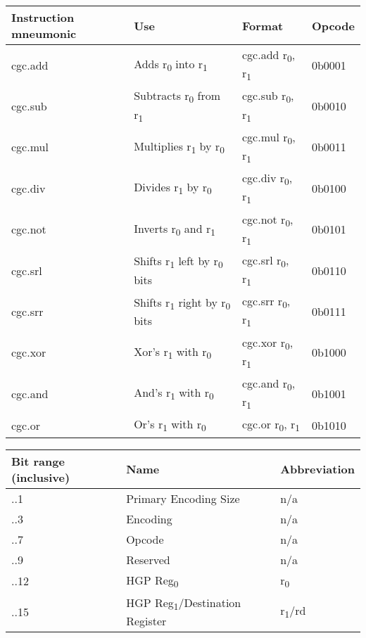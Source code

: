 \documentclass[6pt]{article}
\begin{document}
\begin{center}
\begin{tabularx}{\textwidth}{ |>{\raggedright\arraybackslash}X|>{\raggedright\arraybackslash}X|>{\raggedright\arraybackslash}X|>{\raggedright\arraybackslash}X| }
    \hline
    Instruction mneumonic & Use & Format & Opcode \\
    \hline
    cgc.add & Adds r\textsubscript{0} into r\textsubscript{1} & cgc.add r\textsubscript{0}, r\textsubscript{1} & 0b0001 \\
    \hline
    cgc.sub & Subtracts r\textsubscript{0} from r\textsubscript{1} & cgc.sub r\textsubscript{0}, r\textsubscript{1} & 0b0010 \\
    \hline
    cgc.mul & Multiplies r\textsubscript{1} by r\textsubscript{0} & cgc.mul r\textsubscript{0}, r\textsubscript{1} & 0b0011 \\
    \hline
    cgc.div & Divides r\textsubscript{1} by r\textsubscript{0} & cgc.div r\textsubscript{0}, r\textsubscript{1} & 0b0100 \\
    \hline
    cgc.not & Inverts r\textsubscript{0} and r\textsubscript{1} & cgc.not r\textsubscript{0}, r\textsubscript{1} & 0b0101 \\
    \hline
    cgc.srl & Shifts r\textsubscript{1} left by r\textsubscript{0} bits & cgc.srl r\textsubscript{0}, r\textsubscript{1} & 0b0110 \\
    \hline
    cgc.srr & Shifts r\textsubscript{1} right by r\textsubscript{0} bits & cgc.srr r\textsubscript{0}, r\textsubscript{1} & 0b0111 \\
    \hline
    cgc.xor & Xor's r\textsubscript{1} with r\textsubscript{0} & cgc.xor r\textsubscript{0}, r\textsubscript{1} & 0b1000 \\
    \hline
    cgc.and & And's r\textsubscript{1} with r\textsubscript{0} & cgc.and r\textsubscript{0}, r\textsubscript{1} & 0b1001 \\
    \hline
    cgc.or & Or's r\textsubscript{1} with r\textsubscript{0} & cgc.or r\textsubscript{0}, r\textsubscript{1} & 0b1010 \\
    \hline
\end{tabularx}
\end{center}

\begin{center}
\begin{tabularx}{\textwidth}{ |>{\raggedright\arraybackslash}X|>{\raggedright\arraybackslash}X|>{\raggedright\arraybackslash}X| }
    \hline
    Bit range (inclusive) & Name & Abbreviation \\
    \hline
    0..1 & Primary Encoding Size & n/a \\
    \hline
    2..3 & Encoding & n/a \\
    \hline
    4..7 & Opcode & n/a \\
    \hline
    8..9 & Reserved & n/a \\
    \hline
    10..12 & HGP Reg\textsubscript{0} & r\textsubscript{0} \\
    \hline
    13..15 & HGP Reg\textsubscript{1}/Destination Register & r\textsubscript{1}/rd \\
    \hline
\end{tabularx}
\end{center}
\end{document}
